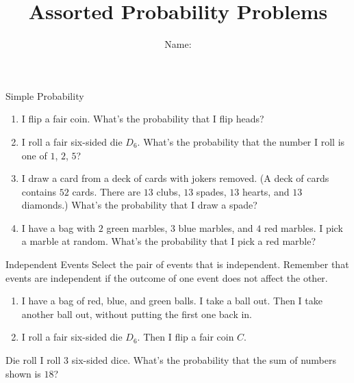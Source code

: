 \documentclass[12pt,letterpaper]{article}
\title{Assorted Probability Problems}
\author{Name: \underline{\hspace{5cm}}}
\begin{document}
\maketitle

\thispagestyle{empty}


\begin{problem}{Simple Probability}
 \begin{enumerate}[\hspace{.5cm}a.]
  \item I flip a fair coin. What's the probability that I flip heads?
  \item I roll a fair six-sided die $D_6$. What's the probability that the
  number I roll is one of $1$, $2$, $5$?
  \item I draw a card from a deck of cards with jokers removed. (A deck of cards
  contains $52$ cards. There are $13$ clubs, $13$ spades, $13$ hearts, and $13$
  diamonds.) What's the probability that I draw a spade?
  \item I have a bag with $2$ green marbles, $3$ blue marbles, and $4$ red
  marbles. I pick a marble at random. What's the probability that I pick a red
  marble?
 \end{enumerate}
\end{problem}

\begin{problem}{Independent Events}
Select the pair of events that is independent. Remember that events are
independent if the outcome of one event does not affect the other.

 \begin{enumerate}[\hspace{.5cm}a.]
  \item I have a bag of red, blue, and green balls. I take a ball out. Then I
  take another ball out, without putting the first one back in.
  \item I roll a fair six-sided die $D_6$. Then I flip a fair coin $C$.
 \end{enumerate}
\end{problem}

\begin{problem}{Die roll}
I roll $3$ six-sided dice. What's the probability that the sum of numbers shown
is $18$?
\end{problem}
\end{document}
